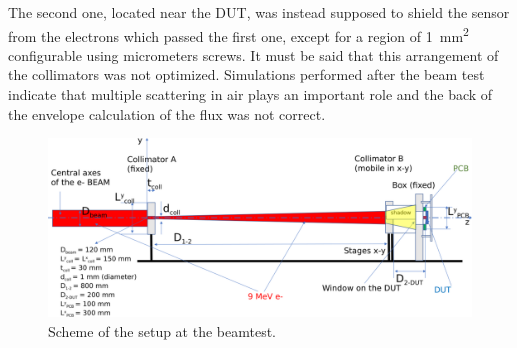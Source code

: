   
      The second one, located near the DUT, was instead supposed to shield the sensor from the electrons which passed the first one, except for a region of \SI{1}{mm\squared} configurable using micrometers screws. 
      It must be said that this arrangement of the collimators was not optimized. Simulations performed after the beam test indicate that multiple scattering in air plays an important role and the back of the envelope calculation of the flux was not correct.    
      \begin{figure}
         \centering
         \includegraphics[width=\linewidth]{figures/test_beam/Flash-beam-scheme.pdf}
         \caption{Scheme of the setup at the beamtest. }
         \label{fig:test_beam_scheme}
      \end{figure} 
